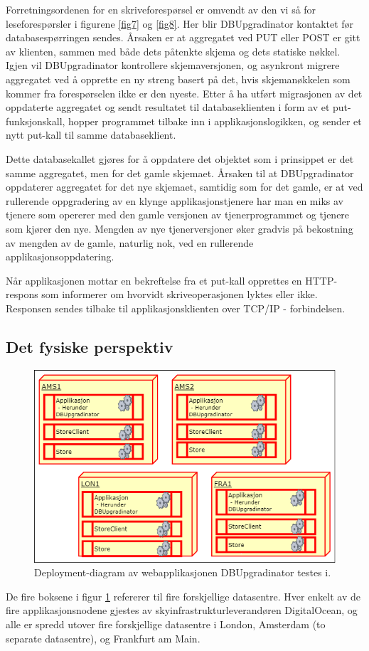 Forretningsordenen for en skriveforespørsel er omvendt av den vi så for leseforespørsler i figurene \ref{fig7} og \ref{fig8}. Her blir DBUpgradinator kontaktet før databasespørringen sendes. Årsaken er at aggregatet ved PUT eller POST er gitt av klienten, sammen med både dets påtenkte skjema og dets statiske nøkkel. Igjen vil DBUpgradinator kontrollere skjemaversjonen, og asynkront migrere aggregatet ved å opprette en ny streng basert på det, hvis skjemanøkkelen som kommer fra forespørselen ikke er den nyeste. Etter å ha utført migrasjonen av det oppdaterte aggregatet og sendt resultatet til databaseklienten i form av et put-funksjonskall, hopper programmet tilbake inn i applikasjonslogikken, og sender et nytt put-kall til samme databaseklient.

Dette databasekallet gjøres for å oppdatere det objektet som i prinsippet er det samme aggregatet, men for det gamle skjemaet. Årsaken til at DBUpgradinator oppdaterer aggregatet for det nye skjemaet, samtidig som for det gamle, er at ved rullerende oppgradering av en klynge applikasjonstjenere har man en miks av tjenere som opererer med den gamle versjonen av tjenerprogrammet og tjenere som kjører den nye. Mengden av nye tjenerversjoner øker gradvis på bekostning av mengden av de gamle, naturlig nok, ved en rullerende applikasjonsoppdatering.

Når applikasjonen mottar en bekreftelse fra et put-kall opprettes en HTTP-respons som informerer om hvorvidt skriveoperasjonen lyktes eller ikke. Responsen sendes tilbake til applikasjonsklienten over TCP/IP - forbindelsen.

\newpage

\subsection{Det fysiske perspektiv}

\begin{figure}[hbtp]
    \centering
    \includegraphics[scale=0.5]{fig/dbupgradinator-physical.png}
    \caption{Deployment-diagram av webapplikasjonen DBUpgradinator testes i.}
    \label{fig10}
\end{figure}

De fire boksene i figur \ref{fig10} refererer til fire forskjellige datasentre. Hver enkelt av de fire applikasjonsnodene gjestes av skyinfrastrukturleverandøren DigitalOcean, og alle er spredd utover fire forskjellige datasentre i London, Amsterdam (to separate datasentre), og Frankfurt am Main.

